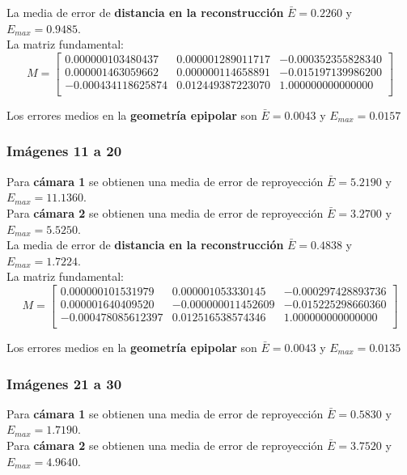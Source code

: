 \documentclass[a4paper, fontsize=11pt]{scrartcl} %
\numberwithin{equation}{section} %
\numberwithin{figure}{section} %
\numberwithin{table}{section} %
\begin{document}
	La media de error de \textbf{distancia en la reconstrucción} $\bar{E} = 0.2260$ y $E_{max} = 0.9485$.\\
	La matriz fundamental:
	\[
	M=
	\begin{bmatrix}
	0.000000103480437&	0.000001289011717&	-0.000352355828340 \\
	0.000001463059662&	0.000000114658891&	-0.015197139986200 \\
	-0.000434118625874&	0.012449387223070&	1.000000000000000  \\
	
	\end{bmatrix}
	\]
	
	Los errores medios en la \textbf{geometría epipolar} son $\bar{E} = 0.0043$ y $E_{max} = 0.0157$
	
	\subsubsection*{Imágenes 11 a 20}
	
	Para \textbf{cámara 1} se obtienen una media de error de reproyección $\bar{E} = 5.2190$ y $E_{max} = 11.1360$.\\
	Para \textbf{cámara 2} se obtienen una media de error de reproyección $\bar{E} = 3.2700$ y $E_{max} = 5.5250$.\\
	
	La media de error de \textbf{distancia en la reconstrucción} $\bar{E} = 0.4838$ y $E_{max} = 1.7224$.\\
	La matriz fundamental:
	\[
	M=
	\begin{bmatrix}
	0.000000101531979&	0.000001053330145&	-0.000297428893736 \\
	0.000001640409520&	-0.000000011452609&	-0.015225298660360 \\
	-0.000478085612397&	0.012516538574346&	1.000000000000000  \\
	
	\end{bmatrix}
	\]
	
	Los errores medios en la \textbf{geometría epipolar} son $\bar{E} = 0.0043$ y $E_{max} = 0.0135$
	
	\subsubsection*{Imágenes 21 a 30}
	
	Para \textbf{cámara 1} se obtienen una media de error de reproyección $\bar{E} = 0.5830$ y $E_{max} = 1.7190$.\\
	Para \textbf{cámara 2} se obtienen una media de error de reproyección $\bar{E} = 3.7520$ y $E_{max} = 4.9640$.\\
	
\end{document}
